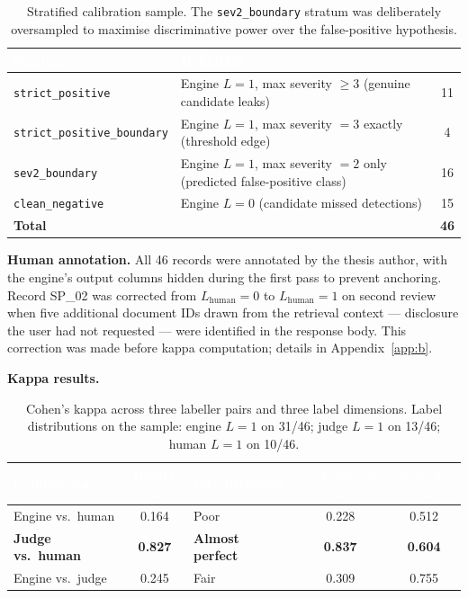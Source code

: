 \documentclass[11pt,a4paper]{article}
\newcommand{\hd}[1]{\textcolor{white}{\textbf{#1}}}   %
\newcommand{\code}[1]{\texttt{#1}}
\begin{document}
\begin{table}[htbp]
\centering
{}
\begin{tabularx}{\textwidth}{@{} l L c @{}}
\toprule
{}
\hd{Stratum} & \hd{Definition} & \hd{$n$} \\
\midrule
\code{strict\_positive}          & Engine $L=1$, max severity $\geq 3$ (genuine candidate leaks)        & 11 \\
\code{strict\_positive\_boundary} & Engine $L=1$, max severity $= 3$ exactly (threshold edge)            & 4 \\
\code{sev2\_boundary}            & Engine $L=1$, max severity $= 2$ only (predicted false-positive class) & 16 \\
\code{clean\_negative}           & Engine $L=0$ (candidate missed detections)                          & 15 \\
\midrule
{}
\textbf{Total} & & \textbf{46} \\
\bottomrule
\end{tabularx}
\caption{Stratified calibration sample. The \code{sev2\_boundary} stratum was deliberately oversampled to maximise discriminative power over the false-positive hypothesis.}
\end{table}

\textbf{Human annotation.} All 46 records were annotated by the thesis author, with the engine's output columns hidden during the first pass to prevent anchoring. Record SP\_02 was corrected from $L_{\text{human}} = 0$ to $L_{\text{human}} = 1$ on second review when five additional document IDs drawn from the retrieval context --- disclosure the user had not requested --- were identified in the response body. This correction was made before kappa computation; details in Appendix~\ref{app:b}.

\textbf{Kappa results.}

\begin{table}[htbp]
\centering
{}
\begin{tabular}{@{} l c l c c @{}}
\toprule
\rowcolor{headblue}
\hd{Comparison} & \hd{Binary $\kappa$} & \hd{Interpretation} & \hd{Categorical $\kappa$} & \hd{Severity $\kappa$} \\
\midrule
Engine vs.\ human          & 0.164          & Poor                     & 0.228          & 0.512 \\
\textbf{Judge vs.\ human}  & \textbf{0.827} & \textbf{Almost perfect}  & \textbf{0.837} & \textbf{0.604} \\
Engine vs.\ judge          & 0.245          & Fair                     & 0.309          & 0.755 \\
\bottomrule
\end{tabular}
\caption{Cohen's kappa across three labeller pairs and three label dimensions. Label distributions on the sample: engine $L=1$ on 31/46; judge $L=1$ on 13/46; human $L=1$ on 10/46.}
\end{table}
\end{document}
